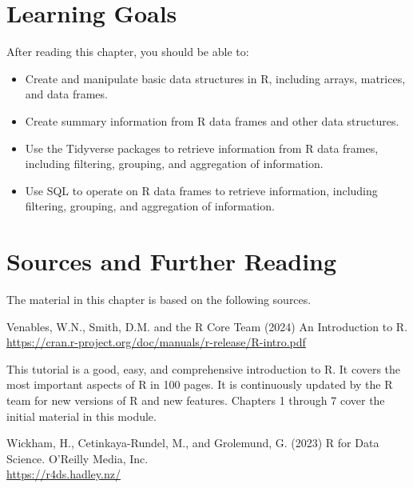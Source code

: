 %
%
\section*{Learning Goals}

After reading this chapter, you should be able to:
\begin{itemize}
   \item Create and manipulate basic data structures in R, including arrays, matrices, and data frames.
   \item Create summary information from R data frames and other data structures.
   \item Use the Tidyverse packages to retrieve information from R data frames, including filtering, grouping, and aggregation of information.
   \item Use SQL to operate on R data frames to retrieve information, including filtering, grouping, and aggregation of information.
\end{itemize}


\section*{Sources and Further Reading}

The material in this chapter is based on the following sources. 

\begin{resourcebox}
Venables, W.N., Smith, D.M. and the R Core Team (2024) An Introduction to R.  \\

\footnotesize
\url{https://cran.r-project.org/doc/manuals/r-release/R-intro.pdf}\normalsize
\end{resourcebox}

This tutorial is a good, easy, and comprehensive introduction to R. It covers the most important aspects of R in 100 pages. It is continuously updated by the R team for new versions of R and new features. Chapters 1 through 7 cover the initial material in this module. 

\begin{resourcebox}
Wickham, H., Cetinkaya-Rundel, M., and Grolemund, G. (2023) R for Data Science. O'Reilly Media, Inc. \\

\footnotesize\url{https://r4ds.hadley.nz/}\normalsize
\end{resourcebox}

